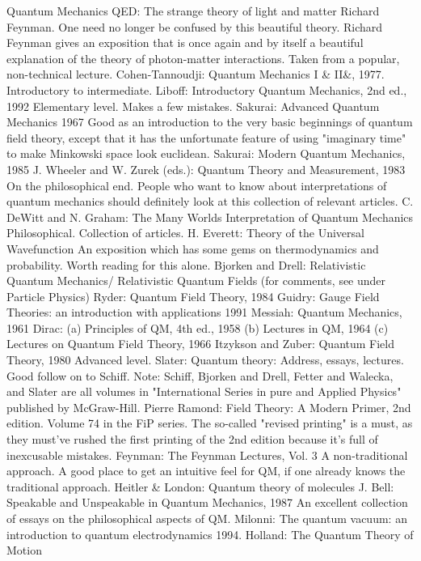 \documentclass[10pt,a4paper]{book}
\theoremstyle{definition}
\begin{document}
Quantum Mechanics
QED: The strange theory of light and matter Richard Feynman.
One need no longer be confused by this beautiful theory.  Richard Feynman gives an exposition that is once again and by itself a beautiful explanation of the theory of photon-matter interactions.  Taken from a popular, non-technical lecture.
Cohen-Tannoudji: Quantum Mechanics I \& II\&, 1977.
Introductory to intermediate.
Liboff: Introductory Quantum Mechanics, 2nd ed., 1992
Elementary level.  Makes a few mistakes.
Sakurai: Advanced Quantum Mechanics 1967
Good as an introduction to the very basic beginnings of quantum field theory, except that it has the unfortunate feature of using "imaginary time" to make Minkowski space look euclidean.
Sakurai: Modern Quantum Mechanics, 1985
J. Wheeler and W. Zurek (eds.): Quantum Theory and Measurement, 1983
On the philosophical end.  People who want to know about interpretations of quantum mechanics should definitely look at this collection of relevant articles.
C. DeWitt and N. Graham: The Many Worlds Interpretation of Quantum Mechanics
Philosophical.  Collection of articles.
H. Everett: Theory of the Universal Wavefunction
An exposition which has some gems on thermodynamics and probability.  Worth reading for this alone.
Bjorken and Drell: Relativistic Quantum Mechanics/ Relativistic Quantum Fields
(for comments, see under Particle Physics)
Ryder: Quantum Field Theory, 1984
Guidry: Gauge Field Theories: an introduction with applications 1991
Messiah: Quantum Mechanics, 1961
Dirac:
(a) Principles of QM, 4th ed., 1958
(b) Lectures in QM, 1964
(c) Lectures on Quantum Field Theory, 1966
Itzykson and Zuber: Quantum Field Theory, 1980
Advanced level.
Slater: Quantum theory: Address, essays, lectures.
Good follow on to Schiff.
Note: Schiff, Bjorken and Drell, Fetter and Walecka, and Slater are all volumes in "International Series in pure and Applied Physics" published by McGraw-Hill.
Pierre Ramond: Field Theory: A Modern Primer, 2nd edition. Volume 74 in the FiP series.
The so-called "revised printing" is a must, as they must've rushed the first printing of the 2nd edition because it's full of inexcusable mistakes.
Feynman: The Feynman Lectures, Vol. 3
A non-traditional approach.  A good place to get an intuitive feel for QM, if one already knows the traditional approach.
Heitler \& London: Quantum theory of molecules
J. Bell: Speakable and Unspeakable in Quantum Mechanics, 1987
An excellent collection of essays on the philosophical aspects of QM.
Milonni: The quantum vacuum: an introduction to quantum electrodynamics 1994.
Holland: The Quantum Theory of Motion
\end{document}
